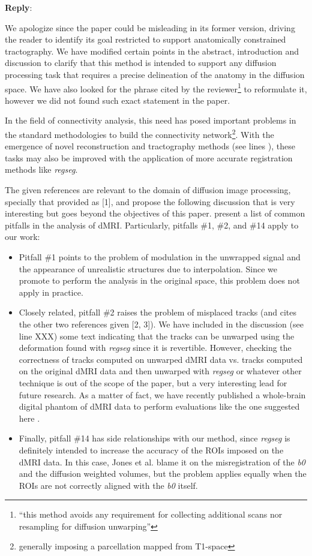 \documentclass[9pt]{memoir}
\newcommand{\reply}{\par\fontshape{n}\selectfont \noindent \textbf{Reply}:\ }
\begin{document}
\reply{%
We apologize since the paper could be misleading in its former version, driving
  the reader to identify its goal restricted to support anatomically constrained
  tractography.
We have modified certain points in the abstract, introduction and discussion to
  clarify that this method is intended to support any diffusion processing task that
  requires a precise delineation of the anatomy in the diffusion space.
We have also looked for the phrase cited by the reviewer\footnote{``this method avoids any
 requirement for collecting additional scans nor resampling for diffusion unwarping''}
 to reformulate it, however we did not found such exact statement in the paper.

In the field of connectivity analysis, this need has posed important problems in the
  standard methodologies to build the connectivity network\footnote{generally imposing
  a parcellation mapped from T1-space}.
With the emergence of novel reconstruction and tractography methods (see lines ),
  these tasks may also be improved with the application of more accurate registration
  methods like \emph{regseg}.

The given references are relevant to the domain of diffusion image processing,
  specially that provided as [1], and propose the following discussion that
  is very interesting but goes beyond the objectives of this paper.
\cite{jones_twentyfive_2010} present a list of common pitfalls in the
  analysis of dMRI.
Particularly, pitfalls \#1, \#2, and \#14 apply to our work:
\begin{itemize}
\item Pitfall \#1 points to the problem of modulation in the unwrapped signal and the
  appearance of unrealistic structures due to interpolation.
Since we promote to perform the analysis in the original space, this problem does not 
  apply in practice.
\item Closely related, pitfall \#2 raises the problem of misplaced tracks (and cites
  the other two references given [2, 3]).
We have included in the discussion (see line XXX) some text indicating that the tracks
  can be unwarped using the deformation found with \emph{regseg} since it is revertible.
However, checking the correctness of tracks computed on unwarped dMRI data vs. tracks computed
  on the original dMRI data and then unwarped with \emph{regseg} or whatever other
  technique is out of the scope of the paper, but a very interesting lead for
  future research.
As a matter of fact, we have recently published a whole-brain digital phantom of dMRI 
  data \citep{esteban_diffantom_2016} to perform evaluations like the one suggested 
  here \citep[for instance, please see][Chapter 5]{esteban_image_2015}.
\item Finally, pitfall \#14 has side relationships with our method, since \emph{regseg} is
  definitely intended to increase the accuracy of the ROIs imposed on the dMRI data.
In this case, Jones et al. blame it on the misregistration of the \emph{b0} and the
  diffusion weighted volumes, but the problem applies equally when the ROIs are
  not correctly aligned with the \emph{b0} itself.
\end{itemize}
}
\end{document}
